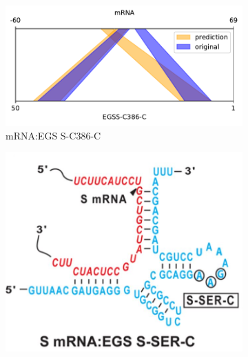 \documentclass[twoside,a4paper]{report}
\numberwithin{equation}{section}
\begin{document}
\begin{figure}[h!tb]
\begin{subfigure}{.25\textwidth}
	 		\label{fig:sc386c}
	 	\end{subfigure}%
 	\begin{subfigure}{.5\textwidth}
 		\centering
 		\includegraphics[width=.9\linewidth]{rricomparison5}
 		\caption{mRNA:EGS S-C386-C}
 		\label{fig:rricomparison5}
 	\end{subfigure}
	 	\begin{subfigure}{.25\textwidth}
	 		\centering
	 		\includegraphics[width=.9\linewidth]{SERC}
	 		

\end{subfigure}
\end{figure}
\end{document}

